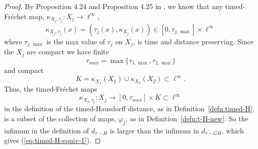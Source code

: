 \documentclass[a4paper,12pt,reqno]{amsart}
\theoremstyle{plain}
\newcommand{\be}{\begin{equation}}
\newcommand{\ee}{\end{equation}}
\begin{document}
\begin{proof}
By Proposition 4.24 and Proposition 4.25 in \cite{SakSor-Notions}, we know that any timed-Fr\'echet map, $\kappa_{X_j,\tau_j}:X_j\to \ell^\infty$,
\be
\kappa_{X_j,\tau_j}(x)=(\tau_j(x),\kappa_{X_j}(x))\in [0,\tau_{j,\max}]\times \ell^\infty
\ee
where $\tau_{j,\max}$ is the max value of $\tau_j$ on $X_j$, is time and distance preserving.  Since the
$X_j$ are compact we have finite
\be
\tau_{max}=\max\{\tau_{1,\max},\tau_{2,\max}\}
\ee
and compact
\be
K=\kappa_{X_1}(X_1)
\cup \kappa_{X_2}(X_2) \subset \ell^\infty.
\ee
Thus, the timed-Fr\'echet maps
\be
\kappa_{X_j,\tau_j}:X_j\to [0,\tau_{max}]\times K \subset \ell^\infty
\ee
in the definition of the timed-Hausdorff distance, as in Definition~\ref{defn:timed-H},
is a subset of the
collection of maps, $\varphi_j$, as in Definition~\ref{defn:t-H-new}. So the infimum in the definition of $d_{\tau-H}$ is larger than the infimum
in $d_{\tau-GH}$,
which gives (\ref{eq:timed-H-equiv-1}).
\end{proof}
\end{document}
